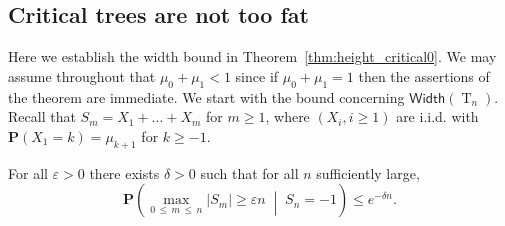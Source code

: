 \documentclass[10pt]{amsart}
\theoremstyle{definition}\newtheorem{defi}[theo]{Definition}\newtheorem{rema}[theo]{Remark}\newtheorem{exam}[theo]{Example}\newtheorem{exem}[theo]{Example}\newtheorem{nota}[theo]{Notation}
\newcommand{\p}{\mathbf{P}}
\newcommand{\Width}{\mathsf{Width}}
\DeclareMathOperator{\rtree}{T}
\newcommand{\set}[1]{\left(#1 \right)}
\newcommand{\Cprob}[2]{\mathbf{P}\set{\left. #1 \; \middle| \; #2\right.}}
\providecommand{\eps}{}
\renewcommand{\eps}{\varepsilon}
\begin{document}
\subsection{Critical trees are not too fat} Here we establish the width bound in Theorem~\ref{thm:height_critical0}. We may assume throughout that $\mu_0+\mu_1<1$ since if $\mu_0+\mu_1=1$ then the assertions of the theorem are immediate. We start with the bound concerning $\Width(\rtree_{n})$. Recall that $S_m=X_1+\ldots+X_m$ for $m \ge 1$, where $(X_i,i \ge 1)$ are i.i.d. with $\p(X_1=k)=\mu_{k+1}$ for $k \ge -1$.

\begin{prop}\label{prop:width_bound}
For all $\eps > 0$ there exists $\delta > 0$ such that for all $n$ sufficiently large,
\[
\Cprob{\max_{0\,\le\,m\,\le\,n} |S_m| \ge \eps n}{S_n=-1} \le e^{-\delta n}.
\]
\end{prop}
\end{document}
